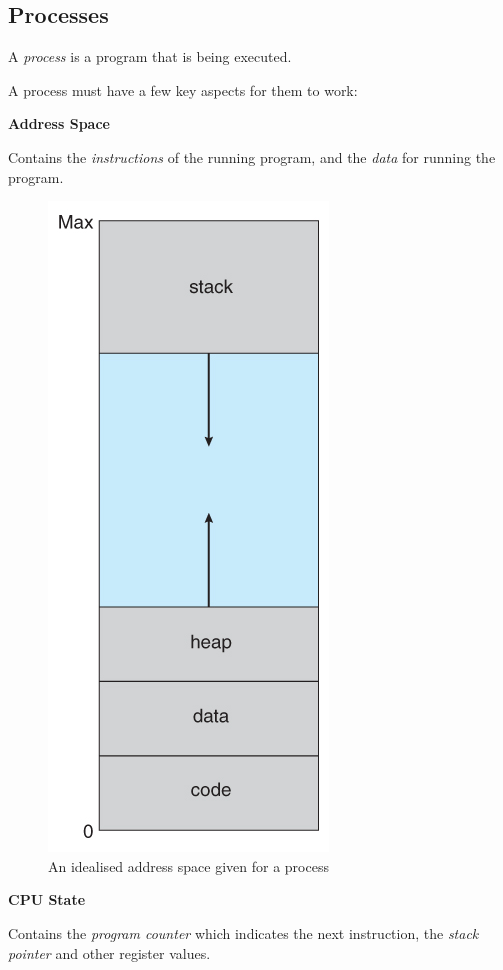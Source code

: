 \documentclass{article}
\begin{document}
\filbreak
\subsection{Processes}

A \textit{process} is a program that is being executed.

A process must have a few key aspects for them to work:

\textbf{Address Space}

Contains the \textit{instructions} of the running program, and the \textit{data} for running the program.

\begin{figure}[H]
  \centering
  \includegraphics[scale=0.64]{addressspace}
  \caption{An idealised address space given for a process}
\end{figure}

\textbf{CPU State}

Contains the \textit{program counter} which indicates the next instruction, the \textit{stack pointer} and other register values.
\end{document}
